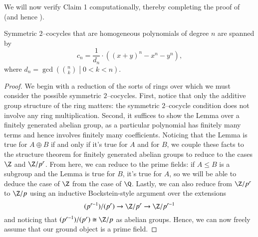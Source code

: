 We will now verify Claim 1 computationally, thereby completing the proof of  (and hence ).

\begin{lemma}\label{Symmetric2CocycleLemma}
Symmetric $2$--cocycles that are homogeneous polynomials of degree $n$ are spanned by \[c_n = \frac{1}{d_n} \cdot ((x + y)^n - x^n - y^n),\] where $d_n = \gcd\left( \binom{n}{k} \middle| 0 < k < n \right)$.
\end{lemma}
\begin{proof}
We begin with a reduction of the sorts of rings over which we must consider the possible symmetric $2$--cocycles.  First, notice that only the additive group structure of the ring matters: the symmetric $2$--cocycle condition does not involve any ring multiplication.  Second, it suffices to show the Lemma over a finitely generated abelian group, as a particular polynomial has finitely many terms and hence involves finitely many coefficients.  Noticing that the Lemma is true for $A \oplus B$ if and only if it's true for $A$ and for $B$, we couple these facts to the structure theorem for finitely generated abelian groups to reduce to the cases $\Z$ and $\Z/p^r$.  From here, we can reduce to the prime fields: if $A \le B$ is a subgroup and the Lemma is true for $B$, it's true for $A$, so we will be able to deduce the case of $\Z$ from the case of $\Q$.  Lastly, we can also reduce from $\Z/p^r$ to $\Z/p$ using an inductive Bockstein-style argument over the extensions \[(p^{r-1}) / (p^r) \to \Z/p^r \to \Z/p^{r-1}\] and noticing that $(p^{r-1}) / (p^r) \cong \Z/p$ as abelian groups.  Hence, we can now freely assume that our ground object is a prime field.


\end{proof}
